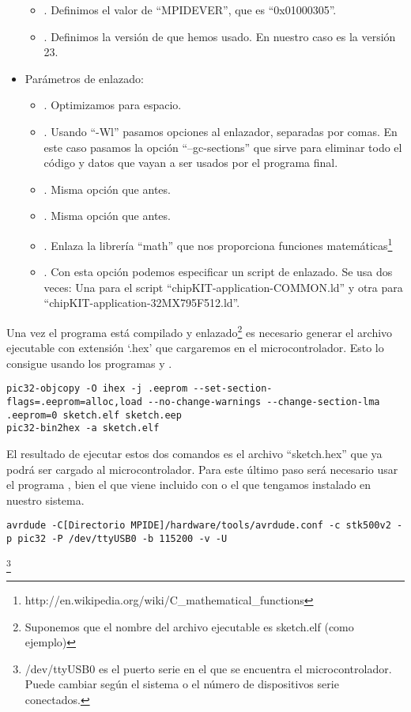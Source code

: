 \begin{itemize}
\begin{itemize}
        \item {}. Definimos el valor de ``MPIDEVER'', que es ``0x01000305''.
        \item {}. Definimos la versión de  que hemos usado. En nuestro caso es la versión 23.
    \end{itemize}
    \item Parámetros de enlazado:
        \begin{itemize}
            \item {}. Optimizamos para espacio.
            \item {}. Usando ``-Wl'' pasamos opciones al enlazador, separadas por comas. En este caso pasamos la opción ``--gc-sections'' que sirve para eliminar todo el código y datos que vayan a ser usados por el programa final.
            \item {}. Misma opción que antes.
            \item {}. Misma opción que antes.
            \item {}. Enlaza la librería ``math'' que nos proporciona funciones matemáticas\protect\footnote{http://en.wikipedia.org/wiki/C\_mathematical\_functions}
            \item {}. Con esta opción podemos especificar un script de enlazado. Se usa dos veces: Una para el script ``chipKIT-application-COMMON.ld'' y otra para ``chipKIT-application-32MX795F512.ld''.
        \end{itemize}
\end{itemize}

Una vez el programa está compilado y enlazado\protect\footnote{Suponemos que el nombre del archivo ejecutable es sketch.elf (como ejemplo)} es necesario generar el archivo ejecutable con extensión `.hex' que cargaremos en el microcontrolador. Esto lo consigue  usando los programas  y .
\begin{lstlisting}[breaklines=true]
pic32-objcopy -O ihex -j .eeprom --set-section-flags=.eeprom=alloc,load --no-change-warnings --change-section-lma .eeprom=0 sketch.elf sketch.eep
pic32-bin2hex -a sketch.elf
\end{lstlisting}

El resultado de ejecutar estos dos comandos es el archivo ``sketch.hex'' que ya podrá ser cargado al microcontrolador.
Para este último paso será necesario usar el programa , bien el que viene incluido con  o el que tengamos instalado en nuestro sistema.
\begin{lstlisting}[breaklines=true]
avrdude -C[Directorio MPIDE]/hardware/tools/avrdude.conf -c stk500v2 -p pic32 -P /dev/ttyUSB0 -b 115200 -v -U
\end{lstlisting}\protect\footnote{/dev/ttyUSB0 es el puerto serie en el que se encuentra el microcontrolador. Puede cambiar según el sistema o el número de dispositivos serie conectados.}

